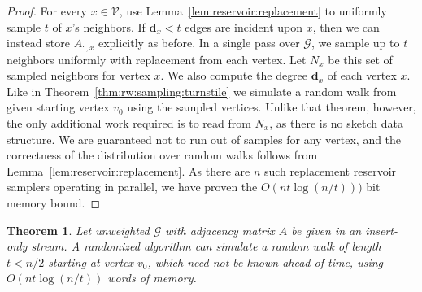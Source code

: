 \documentclass{report}
\newtheorem{theorem}{Theorem}[section]
\begin{document}
\begin{proof}
For every $x \in \mathcal{V}$, use Lemma~\ref{lem:reservoir:replacement} to uniformly sample $t$ of $x$'s neighbors.
If $\mathbf{d}_x < t$ edges are incident upon $x$, then we can instead store $A_{:,x}$ explicitly as before.
In a single pass over $\mathcal{G}$, we sample up to $t$ neighbors uniformly with replacement from each vertex.
Let $N_x$ be this set of sampled neighbors for vertex $x$.
We also compute the degree $\mathbf{d}_x$ of each vertex $x$.
Like in Theorem~\ref{thm:rw:sampling:turnstile} we simulate a random walk from given starting vertex $v_0$ using the sampled vertices. 
Unlike that theorem, however, the only additional work required is to read from $N_x$, as there is no sketch data structure. 
We are guaranteed not to run out of samples for any vertex, and the correctness of the distribution over random walks follows from Lemma~\ref{lem:reservoir:replacement}.
As there are $n$ such replacement reservoir samplers operating in parallel, we have proven the $O(nt\log(n/t)))$ bit memory bound.

\end{proof}

\begin{theorem} \label{thm:rw:sampling:weighted:insert-only}
Let unweighted $\mathcal{G}$ with adjacency matrix $A$ be given in an insert-only stream.
A randomized algorithm can simulate a random walk of length $t < n/2$ starting at vertex $v_0$, which need not be known ahead of time, using $O(nt \log (n/t))$ words of memory.
\end{theorem}
\end{document}
